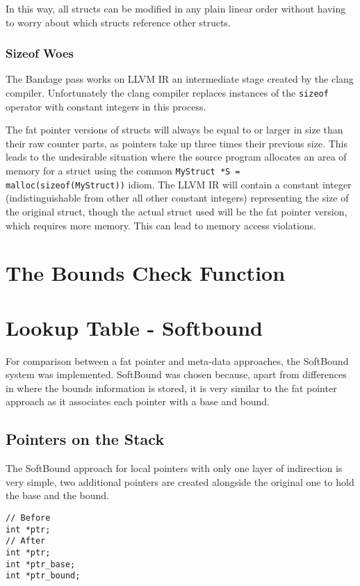 In this way, all structs can be modified in any plain linear order without having to worry about which structs reference other structs.
	
\subsubsection{Sizeof Woes}

The Bandage pass works on LLVM IR an intermediate stage created by the clang compiler.
Unfortunately the clang compiler replaces instances of the \verb!sizeof! operator with constant integers in this process.

The fat pointer versions of structs will always be equal to or larger in size than their raw counter parts, as pointers take up three times their previous size.
This leads to the undesirable situation where the source program allocates an area of memory for a struct using the common \verb!MyStruct *S = malloc(sizeof(MyStruct))! idiom.
The LLVM IR will contain a constant integer (indistinguishable from other all other constant integers) representing the size of the original struct, though the actual struct used will be the fat pointer version, which requires more memory.
This can lead to memory access violations.

\section{The Bounds Check Function}

\section{Lookup Table - Softbound}

For comparison between a fat pointer and meta-data approaches, the SoftBound system was implemented.
SoftBound was chosen because, apart from differences in where the bounds information is stored, it is very similar to the fat pointer approach as it associates each pointer with a base and bound.

\subsection{Pointers on the Stack}

The SoftBound approach for local pointers with only one layer of indirection is very simple, two additional pointers are created alongside the original one to hold the base and the bound.

\begin{verbatim}
// Before
int *ptr;
// After
int *ptr;
int *ptr_base;
int *ptr_bound;
\end{verbatim}

